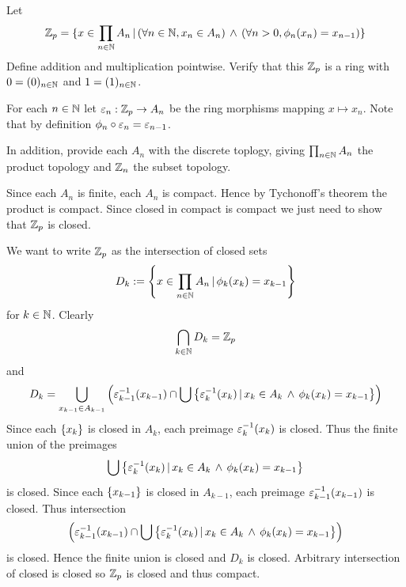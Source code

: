 \begin{dfn}
    Let 
    \[\mathbb{Z}_p = \{x \in \prod_{n \in \mathbb{N}} A_n \,|\, 
    (\forall n \in \mathbb{N}, x_n \in A_n) \, \land \,
    (\forall n > 0, \phi_n(x_n) = x_{n-1})\}\]
    Define addition and multiplication pointwise. 
    Verify that this $\Z_p$ is a ring with $0 = (0)_{n \in \mathbb{N}}$
    and $1 = (1)_{n \in \mathbb{N}}$.

    For each $n \in \mathbb{N}$ let $\varepsilon_n : \mathbb{Z}_p \to A_n$ be the 
    ring morphisms mapping $x \mapsto x_n$.
    Note that by definition $\phi_n \circ \varepsilon_n = \varepsilon_{n-1}$.

    In addition,
    provide each $A_n$  with the discrete toplogy,
    giving $\prod_{n \in \mathbb{N}} A_n$ the product topology
    and $\mathbb{Z}_n$ the subset topology.
\end{dfn}

\begin{prop}[$\Z_p$ is compact]
    Since each $A_n$ is finite, 
    each $A_n$ is compact.
    Hence by Tychonoff's theorem
    the product is compact.
    Since closed in compact is compact
    we just need to show that $\Z_p$ is closed.

    We want to write $\Z_p$ as the intersection of 
    closed sets 
    \[D_k:= \left\{x \in \prod_{n\in\mathbb{N}} A_n \,|\, \phi_k (x_k) = x_{k-1}\right\}\]
    for $k \in \mathbb{N}$.
    Clearly 
    \[\bigcap_{k\in\mathbb{N}} D_k = \mathbb{Z}_p\]
    and 
    \[D_k = \bigcup_{x_{k-1} \in A_{k-1}} \left(\varepsilon_{k-1}^{-1}(x_{k-1}) 
    \cap \bigcup 
    \left\{\varepsilon_k^{-1}(x_k) \,|\, x_k \in A_k \, \land \, \phi_k(x_k) = x_{k-1}\right\}\right)\]
    Since each $\left\{x_k\right\}$ is closed in $A_k$, 
    each preimage $\varepsilon_k^{-1}(x_k)$ is closed.
    Thus the finite union of the preimages
    \[\bigcup 
    \left\{\varepsilon_k^{-1}(x_k) \,|\, x_k \in A_k \, \land \, \phi_k(x_k) = x_{k-1}\right\}\]
    is closed.
    Since each $\left\{x_{k-1}\right\}$ is closed in $A_{k-1}$, 
    each preimage $\varepsilon_{k-1}^{-1}(x_{k-1})$ is closed.
    Thus intersection 
    \[\left(\varepsilon_{k-1}^{-1}(x_{k-1}) 
    \cap \bigcup 
    \left\{\varepsilon_k^{-1}(x_k) \,|\, x_k \in A_k \, \land \, \phi_k(x_k) = x_{k-1}\right\}\right)\]
    is closed.
    Hence the finite union is closed and $D_k$ is closed.
    Arbitrary intersection of closed is closed so $\Z_p$ 
    is closed and thus compact.
\end{prop}

